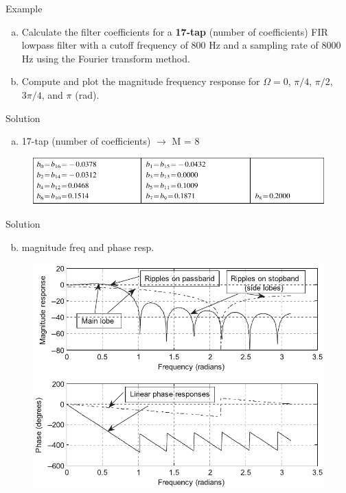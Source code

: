 \documentclass[pdflatex,compress,mathserif]{beamer}
\begin{document}
\begin{frame}{Example}
    \begin{enumerate}[a.]
        \item Calculate the filter coefficients for a \textbf{17-tap} (number of coefficients) FIR lowpass filter with a cutoff frequency of 800 Hz and a sampling rate of 8000 Hz using the Fourier transform method.
        \item Compute and plot the magnitude frequency response for $\Omega = 0$, $\pi/4$, $\pi/2$, $3\pi/4$, and $\pi$ (rad).
    \end{enumerate}
\end{frame}

\begin{frame}{Solution}
    \begin{enumerate}[a.]
        \item 17-tap (number of coefficients) $\rightarrow$ M = 8
    \end{enumerate}
    \begin{figure}
        \centering
        \includegraphics[width=\linewidth]{./img/img12.png}
    \end{figure}
\end{frame}

\begin{frame}{Solution}
    \begin{enumerate}[a.]
        \setcounter{enumi}{1}
        \item magnitude freq and phase resp.
    \end{enumerate}
    \begin{figure}
        \centering
        \includegraphics[width=0.7\linewidth]{./img/img13.png}
    \end{figure}
\end{frame}
\end{document}
